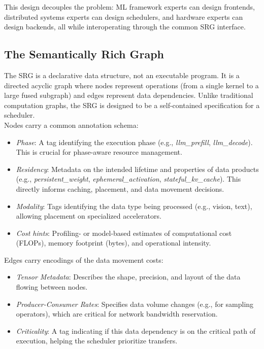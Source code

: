 This design decouples the problem: ML framework experts can design frontends, distributed systems experts can design schedulers, and hardware experts can design backends, all while interoperating through the common SRG interface.

\subsection{The Semantically Rich Graph} 

The SRG is a declarative data structure, not an executable program.
It is a directed acyclic graph where nodes represent operations (from a single kernel to a large fused subgraph) and edges represent data dependencies.
Unlike traditional computation graphs, the SRG is designed to be a self-contained specification for a scheduler.
\noindent\\
Nodes carry a common annotation schema:
\begin{itemize}
    \item \emph{Phase}: A tag identifying the execution phase (e.g., \textit{llm\_pre\-fill}, \textit{llm\_decode}). 
    This is crucial for phase-aware resource management.
    \item \emph{Residency}: Metadata on the intended lifetime and properties of data products (e.g., \textit{persistent\_weight}, \textit{ephemeral\_ac\-tivation}, \textit{stateful\_kv\_cache}).
    This directly informs caching, placement, and data movement decisions.
    \item \emph{Modality}: Tags identifying the data type being processed (e.g., vision, text), allowing placement on specialized accelerators.
    \item \emph{Cost hints}: Profiling- or model-based estimates of computational cost (FLOPs), memory footprint (bytes), and operational intensity.
\end{itemize}
Edges carry encodings of the data movement costs:
\begin{itemize}
    \item \emph{Tensor Metadata}: Describes the shape, precision, and layout of the data flowing between nodes.
    \item \emph{Producer-Consumer Rates}: Specifies data volume changes (e.g., for sampling operators), which are critical for network bandwidth reservation.
    \item \emph{Criticality}: A tag indicating if this data dependency is on the critical path of execution, helping the scheduler prioritize transfers.
\end{itemize}


